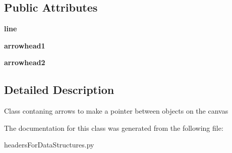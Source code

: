 \subsection*{Public Attributes}
\begin{DoxyCompactItemize}
\item 
\mbox{\label{classheaders_for_data_structures_1_1right_arrow_aee6de10c02c9ea41f85dda3608bc2c29}} 
{\bfseries line}
\item 
\mbox{\label{classheaders_for_data_structures_1_1right_arrow_a8d9040aee6f54367b956a1af7aec6401}} 
{\bfseries arrowhead1}
\item 
\mbox{\label{classheaders_for_data_structures_1_1right_arrow_a057c3637cb94f18827aa4ffa86dd3355}} 
{\bfseries arrowhead2}
\end{DoxyCompactItemize}


\subsection{Detailed Description}
Class contaning arrows to make a pointer between objects on the canvas 

The documentation for this class was generated from the following file\+:\begin{DoxyCompactItemize}
\item 
headers\+For\+Data\+Structures.\+py\end{DoxyCompactItemize}
